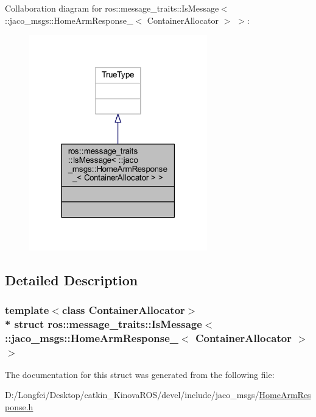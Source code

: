 Collaboration diagram for ros\+:\+:message\+\_\+traits\+:\+:Is\+Message$<$ \+:\+:jaco\+\_\+msgs\+:\+:Home\+Arm\+Response\+\_\+$<$ Container\+Allocator $>$ $>$\+:
\nopagebreak
\begin{figure}[H]
\begin{center}
\leavevmode
\includegraphics[width=219pt]{d5/d52/structros_1_1message__traits_1_1IsMessage_3_01_1_1jaco__msgs_1_1HomeArmResponse___3_01ContainerAllocator_01_4_01_4__coll__graph}
\end{center}
\end{figure}


\subsection{Detailed Description}
\subsubsection*{template$<$class Container\+Allocator$>$\\*
struct ros\+::message\+\_\+traits\+::\+Is\+Message$<$ \+::jaco\+\_\+msgs\+::\+Home\+Arm\+Response\+\_\+$<$ Container\+Allocator $>$ $>$}



The documentation for this struct was generated from the following file\+:\begin{DoxyCompactItemize}
\item 
D\+:/\+Longfei/\+Desktop/catkin\+\_\+\+Kinova\+R\+O\+S/devel/include/jaco\+\_\+msgs/\hyperlink{HomeArmResponse_8h}{Home\+Arm\+Response.\+h}\end{DoxyCompactItemize}
